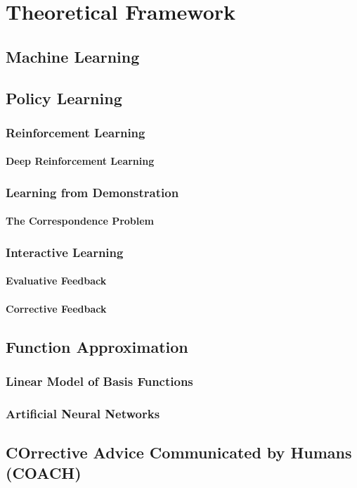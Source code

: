 \chapter{Theoretical Framework}
\section{Machine Learning}
\section{Policy Learning}
\subsection{Reinforcement Learning}
\subsubsection{Deep Reinforcement Learning}
\subsection{Learning from Demonstration}
\subsubsection{The Correspondence Problem}
\subsection{Interactive Learning}
\subsubsection{Evaluative Feedback}
\subsubsection{Corrective Feedback}
\section{Function Approximation}
\subsection{Linear Model of Basis Functions}
\subsection{Artificial Neural Networks}
\section{COrrective Advice Communicated by Humans (COACH)}